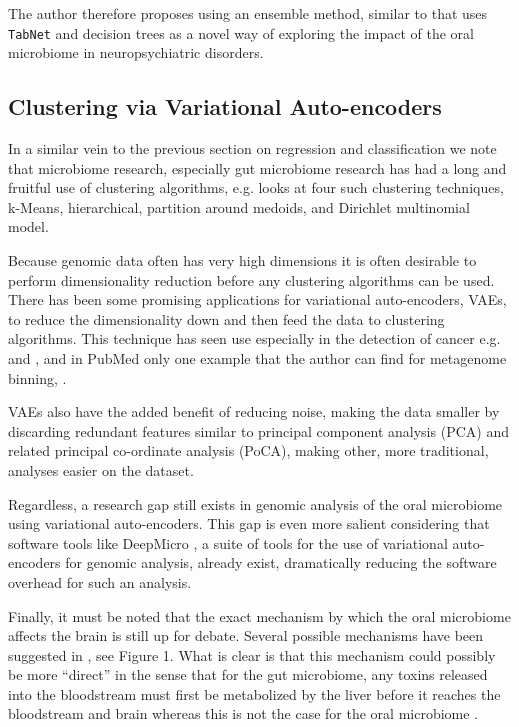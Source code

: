 \documentclass{article}
\begin{document}
\begin{multicols}{2}
The author therefore proposes using an ensemble method, similar to \cite{9908750} that uses \texttt{TabNet} and decision trees as a novel way of exploring the impact of the oral microbiome in neuropsychiatric disorders. 
\subsection{Clustering via Variational Auto-encoders}
In a similar vein to the previous section on regression and classification we note that microbiome research, especially gut microbiome research has had a long and fruitful use of clustering algorithms, e.g. \cite{shi_performance_2022} looks at four such clustering techniques, k-Means, hierarchical, partition around medoids, and Dirichlet multinomial model. 

Because genomic data often has very high dimensions it is often desirable to perform dimensionality reduction before any clustering algorithms can be used. There has been some promising applications for variational auto-encoders, VAEs, to reduce the dimensionality down and then feed the data to clustering algorithms. This technique has seen use especially in the detection of cancer e.g. \cite{hira_integrated_2021} and \cite{8983228}, and in PubMed only one example that the author can find for metagenome binning, \cite{nissen_improved_2021}.

 VAEs also have the added benefit of reducing noise, making the data smaller by discarding redundant features similar to principal component analysis (PCA) and related principal co-ordinate analysis (PoCA), making other, more traditional, analyses easier on the dataset. 
 
 Regardless, a research gap still exists in genomic analysis of the oral microbiome using variational auto-encoders. This gap is even more salient considering that software tools like DeepMicro \cite{oh_deepmicro_2020}, a suite of tools for the use of variational auto-encoders for genomic analysis, already exist, dramatically reducing the software overhead for such an analysis.
 
 Finally, it must be noted that the exact mechanism by which the oral microbiome affects the brain is still up for debate. Several possible mechanisms have been suggested in \cite{tao_relationship_2024}, see Figure 1. What is clear is that this mechanism could possibly be more ``direct'' in the sense that for the gut microbiome, any toxins released into the bloodstream must first be metabolized by the liver before it reaches the bloodstream and brain \cite{REFISCH2023109568} whereas this is not the case for the oral microbiome \cite{tao_relationship_2024}. 
 

\end{multicols}
\end{document}
